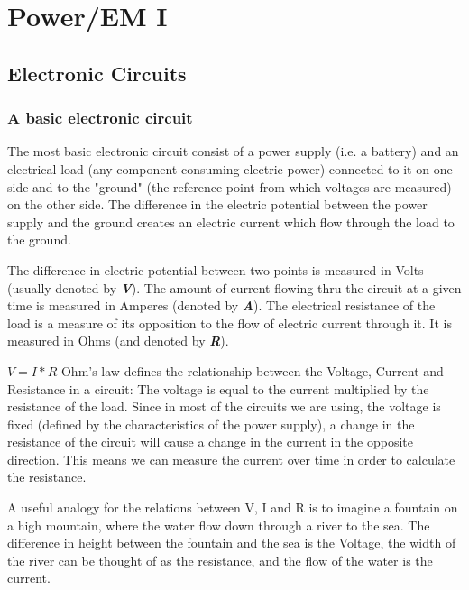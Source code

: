 \chapter{Power/EM I} \label{c4_forthchapter:cha}

\section{Electronic Circuits}
\subsection{A basic electronic circuit}
The most basic electronic circuit consist of a power supply 
(i.e. a battery) and an electrical load (any component consuming electric power) 
connected to it on one side and to the "ground" (the reference point from 
which voltages are measured) on the other side.
The difference in the electric potential between the power supply and the ground
creates an electric current which flow through the load to the ground.

The difference in electric potential between two points is measured in Volts 
(usually denoted by \textbf{\textit{V}}). The amount of current flowing thru
the circuit at a given time is measured in Amperes (denoted by \textbf{\textit{A}}).
The electrical resistance of the load is a measure of its opposition to the flow 
of electric current through it. It is measured in Ohms (and denoted by \textbf{\textit{R}}).

$V=I*R$
\newline
Ohm's law defines the relationship between the Voltage, Current and Resistance in a circuit:
The voltage is equal to the current multiplied by the resistance of the load.
Since in most of the circuits we are using, the voltage is fixed 
(defined by the characteristics of the power supply), a change in the resistance
of the circuit will cause a change in the current in the opposite direction.
This means we can measure the current over time in order to calculate the resistance.

A useful analogy for the relations between V, I and R is to imagine a fountain on a high mountain,
where the water flow down through a river to the sea. The difference in height between the fountain
and the sea is the Voltage, the width of the river can be thought of as the resistance,
and the flow of the water is the current.

